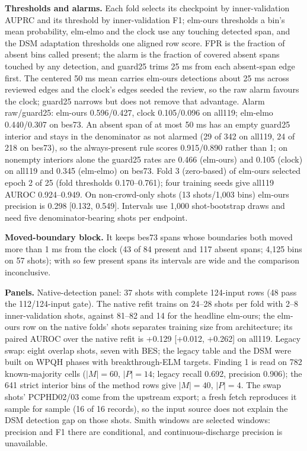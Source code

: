 \textbf{Thresholds and alarms.} Each fold selects its checkpoint by inner-validation AUPRC and its threshold by inner-validation F1; elm-ours thresholds a bin's mean probability, elm-elmo and the clock use any touching detected span, and the DSM adaptation thresholds one aligned row score. FPR is the fraction of absent bins called present; the alarm is the fraction of covered absent spans touched by any detection, and guard25 trims 25 ms from each absent-span edge first. The centered 50 ms mean carries elm-ours detections about 25 ms across reviewed edges and the clock's edges seeded the review, so the raw alarm favours the clock; guard25 narrows but does not remove that advantage. Alarm raw/guard25: elm-ours 0.596/0.427, clock 0.105/0.096 on all119; elm-elmo 0.440/0.307 on bes73. An absent span of at most 50 ms has an empty guard25 interior and stays in the denominator as not alarmed (29 of 342 on all119, 24 of 218 on bes73), so the always-present rule scores 0.915/0.890 rather than 1; on nonempty interiors alone the guard25 rates are 0.466 (elm-ours) and 0.105 (clock) on all119 and 0.345 (elm-elmo) on bes73. Fold 3 (zero-based) of elm-ours selected epoch 2 of 25 (fold thresholds 0.170--0.761); four training seeds give all119 AUROC 0.924--0.949. On non-crowd-only shots (13 shots/1,003 bins) elm-ours precision is 0.298 [0.132, 0.549]. Intervals use 1,000 shot-bootstrap draws and need five denominator-bearing shots per endpoint.

\textbf{Moved-boundary block.} It keeps bes73 spans whose boundaries both moved more than 1 ms from the clock (43 of 84 present and 117 absent spans; 4,125 bins on 57 shots); with so few present spans its intervals are wide and the comparison inconclusive.

\textbf{Panels.} Native-detection panel: 37 shots with complete 124-input rows (48 pass the 112/124-input gate). The native refit trains on 24--28 shots per fold with 2--8 inner-validation shots, against 81--82 and 14 for the headline elm-ours; the elm-ours row on the native folds' shots separates training size from architecture; its paired AUROC over the native refit is +0.129 [+0.012, +0.262] on all119. Legacy swap: eight overlap shots, seven with BES; the legacy table and the DSM were built on WPQH phases with breakthrough-ELM targets. Finding 1 is read on 782 known-majority cells ($|M|=60$, $|P|=14$; legacy recall 0.692, precision 0.906); the 641 strict interior bins of the method rows give $|M|=40$, $|P|=4$. The swap shots' PCPHD02/03 come from the upstream export; a fresh fetch reproduces it sample for sample (16 of 16 records), so the input source does not explain the DSM detection gap on those shots. Smith windows are selected windows: precision and F1 there are conditional, and continuous-discharge precision is unavailable.

